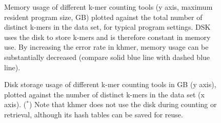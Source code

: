 \documentclass{article}
\begin{document}
\begin{figure}
\caption{Memory usage of different k-mer counting tools (y axis, maximum resident program size, GB) plotted against the total number of distinct k-mers in the data set, for typical program settings. DSK uses the disk to store k-mers and is therefore constant in memory use. By increasing the error rate in khmer, memory usage can be substantially decreased (compare solid blue line with dashed blue line).}
\label{cmp_memory}
\end{figure}

\begin{figure}
\caption{Disk storage usage of different k-mer counting tools in GB (y axis),
plotted against the number of distinct k-mers in the data set (x axis).  ($^*$) Note that khmer does not use the disk during counting or retrieval, although its hash tables can be saved for reuse.}
\label{cmp_disk}
\end{figure}
\end{document}
